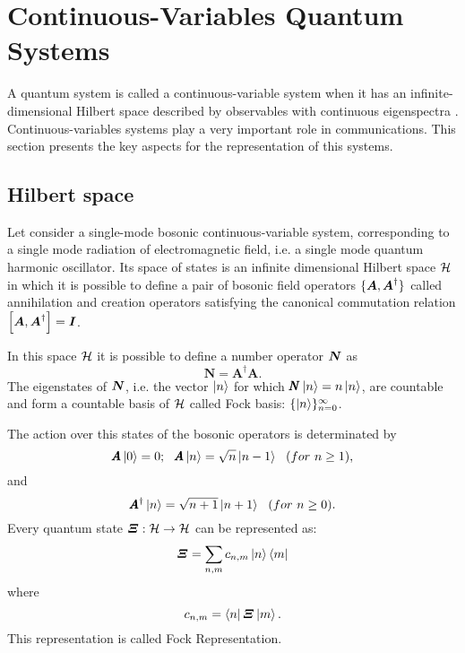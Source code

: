 \section{Continuous-Variables Quantum Systems}
    A quantum system is called a continuous-variable system
    when it has an infinite-dimensional Hilbert space described
    by observables with continuous eigenspectra \cite{ContinuousVar}.
    Continuous-variables systems play a very important role in communications. This
    section presents the key aspects for the representation of this systems.
            
    \subsection{Hilbert space}
        Let consider a single-mode bosonic continuous-variable system, corresponding to a single
        mode radiation of electromagnetic field, i.e. a single mode quantum harmonic oscillator.
        Its space of states is an infinite dimensional Hilbert space $\mathcal{H}$ in which it is possible to define
        a pair of bosonic field operators $\{ \bm{\relax{A}},\bm{\relax{A}}^{\dagger}\}$ called annihilation
        and creation operators \cite{ContinuousVar} satisfying the canonical commutation relation 
        $\commutator{\Operator{A}}{\Operator{A}^\dagger}= \Operator{I}$.

        In this space $\mathcal{H}$ it is possible to define a number operator $\bm{\relax{N}}$ as
        \begin{equation}
            \pmb{N}=\pmb{A}^\dagger \pmb{A}.
        \end{equation}
        The eigenstates of $\bm{\relax{N}}$, i.e. the vector $\ket{n}$ for which
        $\pmb{N}\ket{n}=n\ket{n}$,
        are countable and form a countable basis of $\mathcal{H}$ called
        Fock basis: $\{\ket{n}\}_{n=0}^\infty$.

        The action over this states of the bosonic operators is determinated by \cite{ContinuousVar}
        \begin{equation}
            \pmb{A}\ket{0}=0;\ \ \pmb{A}\ket{n}=\sqrt{n}\ket{n-1}\ \ (for\ n \geq 1),
        \end{equation}
        and
        \begin{equation*}
            \pmb{A}^\dagger\ket{n}=\sqrt{n+1}\ket{n+1}\ \ (for\ n \geq 0).
        \end{equation*}
        Every quantum state $\bm{\relax{\varXi}}:\mathcal{H}\to\mathcal{H}$ can be represented as:
        \begin{equation}
            \bm{\relax{\varXi}}=\sum_{n,m} c_{n,m} \ket{n}\bra{m}
            \label{eq:FockRep}
        \end{equation}
        where
        \begin{equation}
            c_{n,m}=\bra{n}\bm{\relax{\varXi}}\ket{m}.
        \end{equation}
        This representation is called Fock Representation.
        
